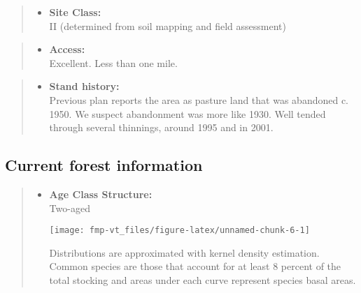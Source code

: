 \documentclass[]{tufte-handout}
\providecommand{\tightlist}{%
  \setlength{\itemsep}{0pt}\setlength{\parskip}{0pt}}
\begin{document}
\begin{quote}
\begin{itemize}
\tightlist
\item
  \textbf{Site Class:}\\
  \vspace{2pt} II (determined from soil mapping and field assessment)
\end{itemize}
\end{quote}

\begin{quote}
\begin{itemize}
\tightlist
\item
  \textbf{Access:}\\
  \vspace{2pt} Excellent. Less than one mile.
\end{itemize}
\end{quote}

\begin{quote}
\begin{itemize}
\tightlist
\item
  \textbf{Stand history:}\\
  \vspace{2pt} Previous plan reports the area as pasture land that was
  abandoned c. 1950. We suspect abandonment was more like 1930. Well
  tended through several thinnings, around 1995 and in 2001.
\end{itemize}
\end{quote}

\subsection{Current forest
information}\label{current-forest-information-1}

\begin{quote}
\begin{itemize}
\tightlist
\item
  \textbf{Age Class Structure:}\\
  \vspace{2pt} Two-aged\\

  \begin{marginfigure}
  \texttt{[image: fmp-vt\_files/figure-latex/unnamed-chunk-6-1]} \caption[Distributions are approximated with kernel density estimation]{Distributions are approximated with kernel density estimation. Common species are those that account for at least 8 percent of the total stocking and areas under each curve represent species basal areas.}\label{fig:unnamed-chunk-6}
  \end{marginfigure}
\end{itemize}
\end{quote}
\end{document}
